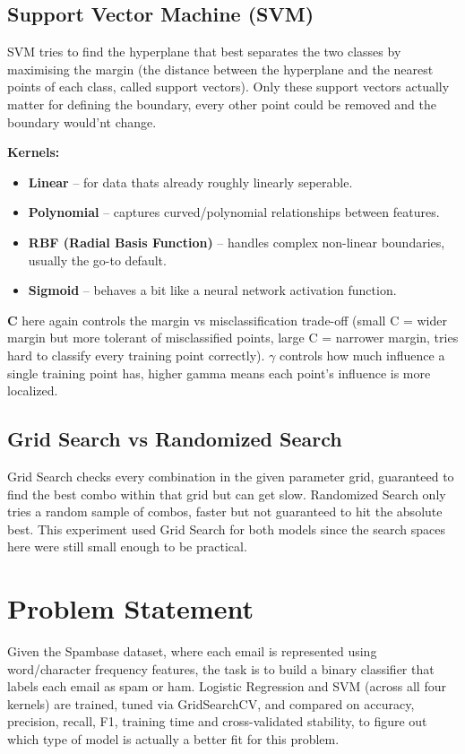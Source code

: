 \documentclass[12pt,a4paper]{article}
\begin{document}
\subsection*{Support Vector Machine (SVM)}
SVM tries to find the hyperplane that best separates the two classes by maximising the margin (the distance between the hyperplane and the nearest points of each class, called support vectors). Only these support vectors actually matter for defining the boundary, every other point could be removed and the boundary would'nt change.

\textbf{Kernels:}
\begin{itemize}
\item \textbf{Linear} -- for data thats already roughly linearly seperable.
\item \textbf{Polynomial} -- captures curved/polynomial relationships between features.
\item \textbf{RBF (Radial Basis Function)} -- handles complex non-linear boundaries, usually the go-to default.
\item \textbf{Sigmoid} -- behaves a bit like a neural network activation function.
\end{itemize}
\textbf{C} here again controls the margin vs misclassification trade-off (small C = wider margin but more tolerant of misclassified points, large C = narrower margin, tries hard to classify every training point correctly). \textbf{$\gamma$} controls how much influence a single training point has, higher gamma means each point's influence is more localized.

\subsection*{Grid Search vs Randomized Search}
Grid Search checks every combination in the given parameter grid, guaranteed to find the best combo within that grid but can get slow. Randomized Search only tries a random sample of combos, faster but not guaranteed to hit the absolute best. This experiment used Grid Search for both models since the search spaces here were still small enough to be practical.

\section{Problem Statement}
Given the Spambase dataset, where each email is represented using word/character frequency features, the task is to build a binary classifier that labels each email as spam or ham. Logistic Regression and SVM (across all four kernels) are trained, tuned via GridSearchCV, and compared on accuracy, precision, recall, F1, training time and cross-validated stability, to figure out which type of model is actually a better fit for this problem.
\end{document}
